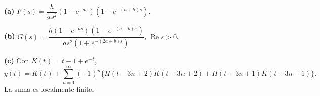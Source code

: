 \noindent\textbf{(a)} $F(s)=\dfrac{h}{as^2}(1-e^{-as})(1-e^{-(a+b)s})$.

\noindent\textbf{(b)} $G(s)=\dfrac{h(1-e^{-as})(1-e^{-(a+b)s})}{as^2(1+e^{-(2a+b)s})}$, $\operatorname{Re}s>0$.

\noindent\textbf{(c)} Con $K(t)=t-1+e^{-t}$,
\[y(t)=K(t)+\sum_{n=1}^\infty(-1)^n\{H(t-3n+2)K(t-3n+2)+H(t-3n+1)K(t-3n+1)\}.\]
La suma es localmente finita.
